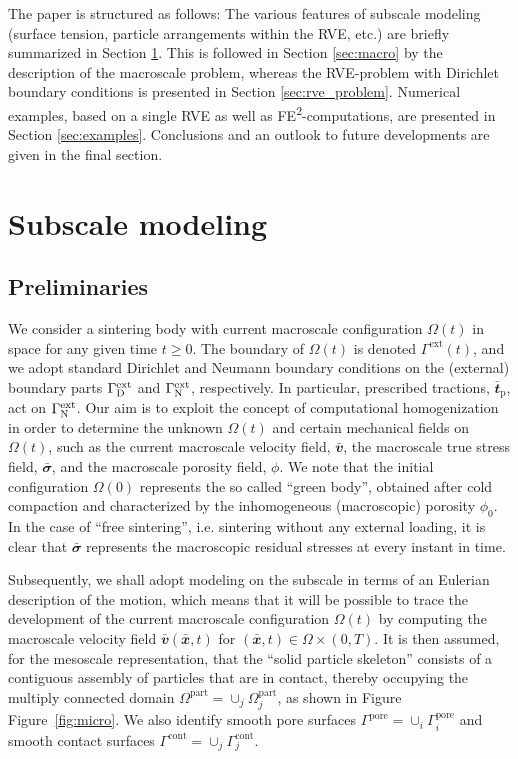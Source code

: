 \documentclass[10pt,a4paper,fleqn]{article}
\renewcommand{\ta}[1]{\mathbfit{#1}}
\renewcommand{\ts}[1]{\mathbfit{#1}}
\newcommand{\figref}[1]{Figure~\ref{#1}}
\newcommand{\pore}{\mathrm{pore}}
\newcommand{\particle}{\mathrm{part}}
\newcommand{\prescribed}{\mathrm{p}}
\newcommand{\contact}{\mathrm{cont}}
\newcommand{\external}{\mathrm{ext}}
\begin{document}
The paper is structured as follows:
The various features of subscale modeling (surface tension, particle arrangements within the RVE, etc.) are briefly summarized in Section \ref{sec:subscale}. This is followed in Section \ref{sec:macro} by the description of the macroscale problem, whereas the RVE-problem with Dirichlet boundary conditions is presented in Section \ref{sec:rve_problem}. Numerical examples, based on a single RVE as well as FE\textsuperscript{2}-computations, are presented in Section \ref{sec:examples}. Conclusions and an outlook to future developments are given in the final section.


\section{Subscale modeling}\label{sec:subscale}

\subsection{Preliminaries}

We consider a sintering body with current macroscale configuration $\Omega(t)$ in space for any given time $t\geq 0$. The boundary of $\Omega(t)$ is denoted $\Gamma^\external(t)$, and we adopt standard Dirichlet and Neumann boundary conditions on the (external) boundary parts $\Gamma^\external_\Dirichlet$ and $\Gamma^\external_\Neumann$, respectively. In particular, prescribed tractions, $\bar{\ta t}_\prescribed$, act on $\Gamma^\external_\Neumann$.  Our aim is to exploit the concept of computational homogenization in order to determine the unknown $\Omega(t)$ and certain mechanical fields on $\Omega(t)$, such as the current macroscale velocity field, $\bar{\ts v}$, the macroscale true stress field, $\bar{\ts\sigma}$, and the macroscale porosity field, $\phi$. We note that the initial configuration $\Omega(0)$ represents the so called ``green body'', obtained after cold compaction and characterized by the inhomogeneous (macroscopic) porosity $\phi_0$. In the case of ``free sintering'', i.e. sintering without any external loading, it is clear that $\bar{\ts\sigma}$ represents the macroscopic residual stresses at every instant in time.

Subsequently, we shall adopt modeling on the subscale in terms of an Eulerian description of the motion, which means that it will be possible to trace the development of the current macroscale configuration $\Omega(t)$ by computing the macroscale velocity field $\bar{\ta v}(\bar{\ta x},t)$ for $(\bar{\ta x},t)\in\Omega\times(0,T)$. It is then assumed, for the mesoscale representation, that the ``solid particle skeleton'' consists of a contiguous assembly of particles that are in contact, thereby occupying the multiply connected domain $\Omega^\particle=\cup_j\Omega^\particle_j$, as shown in Figure \figref{fig:micro}. We also identify smooth pore surfaces $\Gamma^\pore=\cup_i\Gamma^\pore_i$ and smooth contact surfaces $\Gamma^\contact=\cup_j\Gamma^\contact_j$.
\end{document}
